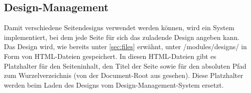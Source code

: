 \subsection{Design-Management}
Damit verschiedene Seitendesigns verwendet werden können, wird ein System implementiert, bei dem jede Seite für sich das zuladende Design angeben kann. Das Design wird, wie bereits unter \autoref{sec:files} erwähnt, unter /modules/designs/ in Form von HTML-Dateien gespeichert. In diesen HTML-Dateien gibt es Platzhalter für den Seiteninhalt, den Titel der Seite sowie für den absoluten Pfad zum Wurzelverzeichnis (von der Document-Root aus gesehen). Diese Platzhalter werden beim Laden des Designs vom Design-Management-System ersetzt.